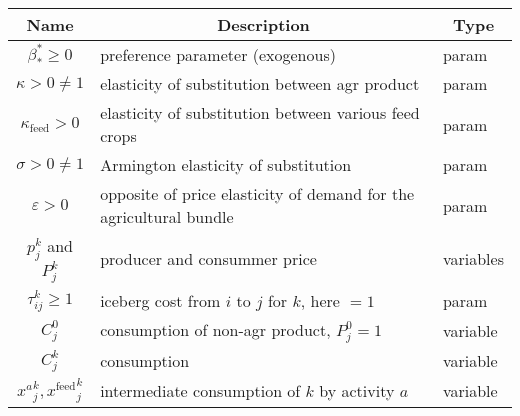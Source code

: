 \begin{table}[h!]
    \begin{tabular}{c|l|l}
        \multicolumn{1}{c}{\textbf{Name}}           & \multicolumn{1}{|c|}{\textbf{Description}}                         & \multicolumn{1}{c}{\textbf{Type}} \\
        \hline
        $\beta_*^* \ge 0$                           & preference parameter (exogenous)                                   & param                             \\

        $\kappa > 0 \neq 1$                         & elasticity of substitution between agr product                     & param                             \\

        $\kappa_{\text{feed}} > 0$                  & elasticity of substitution between various feed crops              & param                             \\

        $\sigma > 0 \neq 1$                         & Armington elasticity of substitution                               & param                             \\

        $\varepsilon > 0$                           & opposite of price elasticity of demand for the agricultural bundle & param                             \\

        $p_j^k$ and $P_j^k$                         & producer and consummer price                                       & variables                         \\

        $\tau_{ij}^k \ge 1$                         & iceberg cost from $i$ to $j$ for $k$, here $=1$                    & param                             \\

        $C_j^0$                                     & consumption of non-agr product, $P_j^0 = 1$                        & variable                          \\

        $C_j^k$                                     & consumption                                                        & variable                          \\

        ${x^a}_j^k, {x^\text{feed}}_j^k$            & intermediate consumption of $k$ by activity $a$                    & variable                          \\


\end{tabular}
\end{table}
